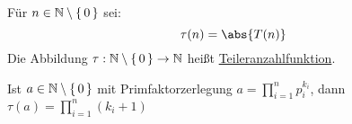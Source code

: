 \documentclass{../../meta/tudscript}
\begin{document}
Für $n \in \mathbb{N} \setminus \set{0}$ sei:
\begin{equation*}
\tau (n) = \abs{T(n)}
\end{equation*}
Die Abbildung $\tau: \mathbb{N} \setminus \set{0} \rightarrow \mathbb{N}$ heißt \underline{Teileranzahlfunktion}.


Ist $a \in \mathbb{N} \setminus \set{0}$ mit Primfaktorzerlegung $a = \prod_{i=1}^n p_i^{k_i}$, dann
$ \tau (a) = \prod_{i=1}^n \left( k_i +1 \right) $
\end{document}
